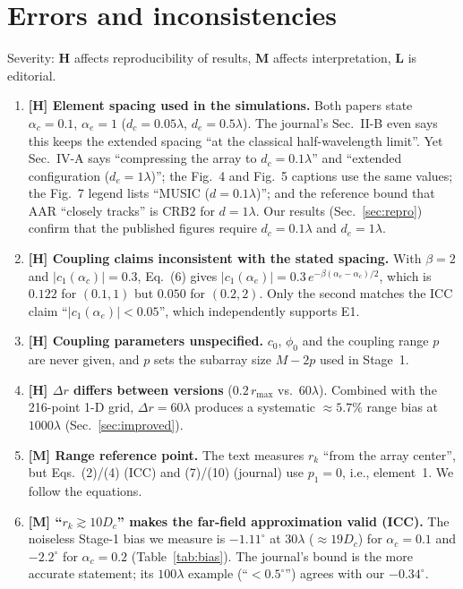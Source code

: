 \documentclass[11pt,a4paper]{article}
\newcommand{\dc}{d_c}\newcommand{\de}{d_e}
\begin{document}
\section{Errors and inconsistencies}
Severity: \textbf{H} affects reproducibility of results, \textbf{M} affects interpretation,
\textbf{L} is editorial.
\begin{enumerate}[label=\textbf{E\arabic*}]
\item \textbf{[H] Element spacing used in the simulations.} Both papers state $\alpha_c=0.1$, $\alpha_e=1$
($\dc=0.05\lambda$, $\de=0.5\lambda$). The journal's Sec.~II-B even says this keeps the extended spacing
``at the classical half-wavelength limit''. Yet Sec.~IV-A says ``compressing the array to $\dc=0.1\lambda$''
and ``extended configuration ($\de=1\lambda$)''; the Fig.~4 and Fig.~5 captions use the same values; the Fig.~7 legend
lists ``MUSIC ($d=0.1\lambda$)''; and the reference bound that AAR ``closely tracks'' is CRB2 for $d=1\lambda$.
Our results (Sec.~\ref{sec:repro}) confirm that the published figures require $\dc=0.1\lambda$ and $\de=1\lambda$.
\item \textbf{[H] Coupling claims inconsistent with the stated spacing.} With $\beta=2$ and $|c_1(\alpha_c)|=0.3$,
Eq.~(6) gives $|c_1(\alpha_e)|=0.3\,e^{-\beta(\alpha_e-\alpha_c)/2}$, which is $0.122$ for $(0.1,1)$ but $0.050$ for $(0.2,2)$.
Only the second matches the ICC claim ``$|c_1(\alpha_e)|<0.05$'', which independently supports E1.
\item \textbf{[H] Coupling parameters unspecified.} $c_0$, $\phi_0$ and the coupling range $p$ are never given,
and $p$ sets the subarray size $M-2p$ used in Stage~1.
\item \textbf{[H] $\Delta r$ differs between versions} ($0.2\,r_{\max}$ vs.\ $60\lambda$). Combined with the 216-point
1-D grid, $\Delta r=60\lambda$ produces a systematic $\approx5.7\%$ range bias at $1000\lambda$ (Sec.~\ref{sec:improved}).
\item \textbf{[M] Range reference point.} The text measures $r_k$ ``from the array center'', but Eqs.~(2)/(4) (ICC)
and (7)/(10) (journal) use $p_1=0$, i.e., element~1. We follow the equations.
\item \textbf{[M] ``$r_k\gtrsim10D_c$'' makes the far-field approximation valid (ICC).} The noiseless Stage-1 bias we
measure is $-1.11^\circ$ at $30\lambda$ ($\approx19D_c$) for $\alpha_c=0.1$ and $-2.2^\circ$ for $\alpha_c=0.2$
(Table~\ref{tab:bias}). The journal's bound is the more accurate statement; its $100\lambda$ example
(``$<0.5^\circ$'') agrees with our $-0.34^\circ$.

\end{enumerate}
\end{document}
